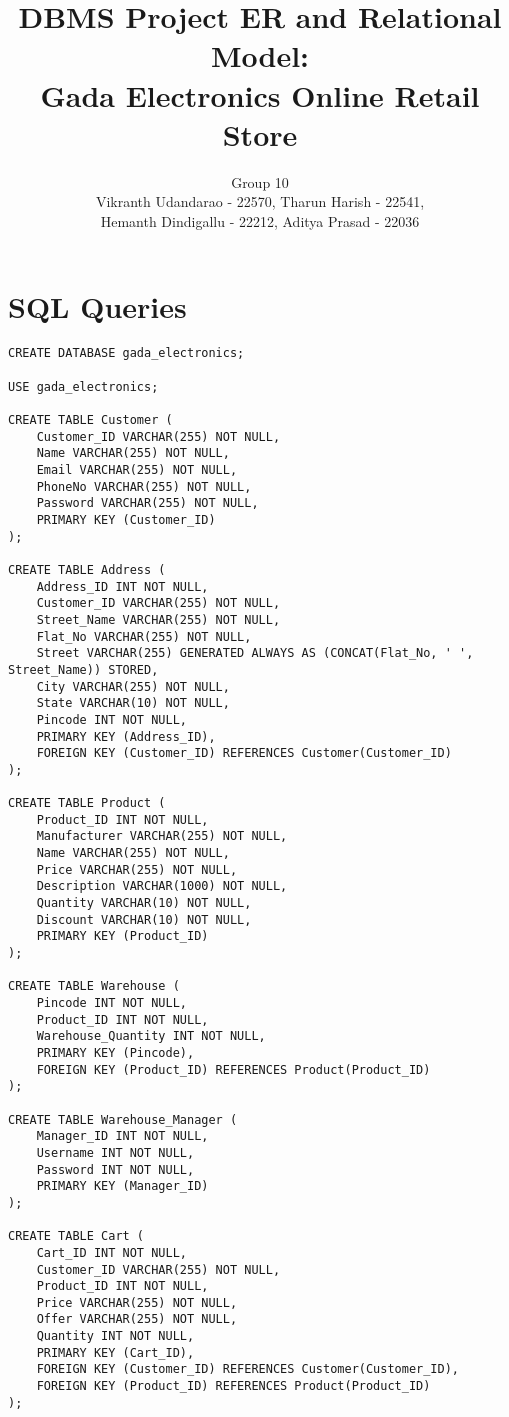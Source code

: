 \documentclass[12pt]{article}
\begin{document}
\title{\textbf{DBMS Project ER and Relational Model: \\ Gada Electronics Online Retail Store}}
\author{Group 10 \\ Vikranth Udandarao - 22570, Tharun Harish - 22541, \\ Hemanth Dindigallu - 22212, Aditya Prasad - 22036}
\date{}
\maketitle

\section*{SQL Queries}

\begin{verbatim}
CREATE DATABASE gada_electronics;

USE gada_electronics;

CREATE TABLE Customer (
    Customer_ID VARCHAR(255) NOT NULL,
    Name VARCHAR(255) NOT NULL,
    Email VARCHAR(255) NOT NULL,
    PhoneNo VARCHAR(255) NOT NULL,
    Password VARCHAR(255) NOT NULL,
    PRIMARY KEY (Customer_ID)
);

CREATE TABLE Address (
    Address_ID INT NOT NULL,
    Customer_ID VARCHAR(255) NOT NULL,
    Street_Name VARCHAR(255) NOT NULL,
    Flat_No VARCHAR(255) NOT NULL,
    Street VARCHAR(255) GENERATED ALWAYS AS (CONCAT(Flat_No, ' ', Street_Name)) STORED,
    City VARCHAR(255) NOT NULL,
    State VARCHAR(10) NOT NULL,
    Pincode INT NOT NULL,
    PRIMARY KEY (Address_ID),
    FOREIGN KEY (Customer_ID) REFERENCES Customer(Customer_ID)
);

CREATE TABLE Product (
    Product_ID INT NOT NULL,
    Manufacturer VARCHAR(255) NOT NULL,
    Name VARCHAR(255) NOT NULL,
    Price VARCHAR(255) NOT NULL,
    Description VARCHAR(1000) NOT NULL,
    Quantity VARCHAR(10) NOT NULL,
    Discount VARCHAR(10) NOT NULL,
    PRIMARY KEY (Product_ID)
);

CREATE TABLE Warehouse (
    Pincode INT NOT NULL,
    Product_ID INT NOT NULL,
    Warehouse_Quantity INT NOT NULL,
    PRIMARY KEY (Pincode),
    FOREIGN KEY (Product_ID) REFERENCES Product(Product_ID)
);

CREATE TABLE Warehouse_Manager (
    Manager_ID INT NOT NULL,
    Username INT NOT NULL,
    Password INT NOT NULL,
    PRIMARY KEY (Manager_ID)
);

CREATE TABLE Cart (
    Cart_ID INT NOT NULL,
    Customer_ID VARCHAR(255) NOT NULL,
    Product_ID INT NOT NULL,
    Price VARCHAR(255) NOT NULL,
    Offer VARCHAR(255) NOT NULL,
    Quantity INT NOT NULL,
    PRIMARY KEY (Cart_ID),
    FOREIGN KEY (Customer_ID) REFERENCES Customer(Customer_ID),
    FOREIGN KEY (Product_ID) REFERENCES Product(Product_ID)
);


\end{verbatim}
\end{document}
